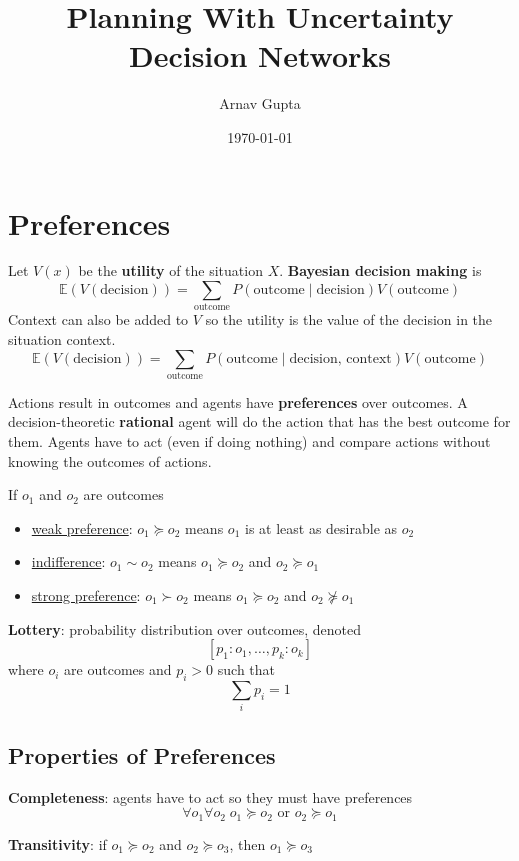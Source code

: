 \documentclass[11pt]{article}
\author{Arnav Gupta}
\date{\today}
\title{Planning With Uncertainty Decision Networks}
\begin{document}
\maketitle
\tableofcontents

\section{Preferences}
\label{sec:org3aeb0d4}
Let \(V(x)\) be the \textbf{utility} of the situation \(X\).
\textbf{Bayesian decision making} is
$$ \mathbb{E}(V(\text{decision})) = \sum_{\text{outcome}} P(\text{outcome} \mid \text{decision}) V(\text{outcome}) $$
Context can also be added to \(V\) so the utility is the value of the decision in the situation context.
$$ \mathbb{E}(V(\text{decision})) = \sum_{\text{outcome}} P(\text{outcome} \mid \text{decision, context}) V(\text{outcome}) $$

Actions result in outcomes and agents have \textbf{preferences} over outcomes.
A decision-theoretic \textbf{rational} agent will do the action that has the best outcome for them.
Agents have to act (even if doing nothing) and compare actions without knowing the
outcomes of actions.

If \(o_{1}\) and \(o_{2}\) are outcomes
\begin{itemize}
\item \uline{weak preference}: \(o_{1} \succeq o_{2}\) means \(o_{1}\) is at least as desirable as \(o_{2}\)
\item \uline{indifference}: \(o_{1} \sim o_{2}\) means \(o_{1} \succeq o_{2}\) and \(o_{2} \succeq o_{1}\)
\item \uline{strong preference}: \(o_{1} \succ o_{2}\) means \(o_{1} \succeq o_{2}\) and \(o_{2} \not\succeq o_{1}\)
\end{itemize}


\textbf{Lottery}: probability distribution over outcomes, denoted
$$ [p_{1} : o_{1}, \dots, p_{k} : o_{k}] $$
where \(o_{i}\) are outcomes and \(p_{i} > 0\) such that
$$ \sum_{i} p_{i} = 1 $$
\subsection{Properties of Preferences}
\label{sec:org509f6e6}
\textbf{Completeness}: agents have to act so they must have preferences
$$ \forall o_{1} \forall o_{2} \; o_{1} \succeq o_{2} \text{ or } o_{2} \succeq o_{1} $$

\textbf{Transitivity}: if \(o_{1} \succeq o_{2}\) and \(o_{2} \succeq o_{3}\), then \(o_{1} \succeq o_{3}\)
\end{document}
